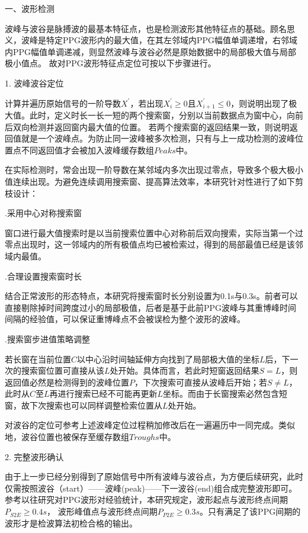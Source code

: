 一、波形检测

波峰与波谷是脉搏波的最基本特征点，也是检测波形其他特征点的基础。顾名思义，波峰是特定PPG波形内的最大值，在其左邻域内PPG幅值单调递增，右邻域内PPG幅值单调递减，则显然波峰与波谷必然是原始数据中的局部极大值与局部极小值点。
故对PPG波形特征点定位可按以下步骤进行。

1. 波峰波谷定位

计算并遍历原始信号的一阶导数$X^{'}$，若出现$X_i^{'}\ge 0$且$X_{i+1}^{'}\le 0$，则说明出现了极大值。此时，定义时长一长一短的两个搜索窗，分别以当前数据点为窗中心，向前后双向检测并返回窗内最大值的位置。
若两个搜索窗的返回结果一致，则说明返回值就是一个波峰点。为防止同一波峰被多次检测，只有与上一成功检测的波峰位置点不同返回值才会被加入波峰缓存数组$Peaks$中。

在实际检测时，常会出现一阶导数在某邻域内多次出现过零点，导致多个极大极小值连续出现。为避免连续调用搜索窗、提高算法效率，本研究针对性进行了如下剪枝设计：

.采用中心对称搜索窗

窗口进行最大值搜索时是以当前搜索位置中心对称前后双向搜索，实际当第一个过零点出现时，这一邻域内的所有极值点均已被检索过，得到的局部最值已经是该邻域内最值。

.合理设置搜索窗时长

结合正常波形的形态特点，本研究将搜索窗时长分别设置为0.1s与0.3s。前者可以直接剔除掉时间跨度过小的局部极值，后者是基于此前PPG波峰与其重博峰时间间隔的经验值，可以保证重博峰点不会被误检为整个波形的波峰。

.搜索窗步进值策略调整

若长窗在当前位置$C$以中心沿时间轴延伸方向找到了局部极大值的坐标$L$后，下一次的搜索窗位置可直接从该$L$处开始。具体而言，若此时短窗返回结果$S=L$，则返回值必然是检测得到的波峰位置$P$，下次搜索可直接从波峰后开始；若$S\ne L$，
此时从$C$至$L$再进行搜索已经不可能再更新$L$坐标。而由于长窗搜索必然包含短窗，故下次搜索也可以同样调整检索位置从$L$处开始。

对波谷的定位可参考上述波峰定位过程稍加修改后在一遍遍历中一同完成。类似地，波谷位置也被保存至缓存数组$Troughs$中。

2. 完整波形确认

由于上一步已经分别得到了原始信号中所有波峰与波谷点，为方便后续研究，此时仅需按照波谷（start）——波峰(peak)——下一波谷(end)组合成完整波形即可。参考以往研究对PPG波形对经验统计，本研究规定，波形起点与波形终点间期$P_{S2E}\ge 0.4s$，
波形峰值点与波形终点间期$P_{P2E}\ge 0.3s$。只有满足了该PPG间期的波形才是检波算法初检合格的输出。

